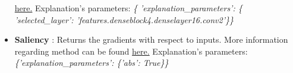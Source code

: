 \documentclass{article}%
\begin{document}
\begin{itemize}
\href{https://arxiv.org/abs/1610.02391}{here.}%
\newline%
%
Explanation's parameters: \newline%
%
\textit{\{   'explanation\_parameters': \{   'selected\_layer': 'features.denseblock4.denselayer16.conv2'\}\} \newline%
}%
\item%
\textbf{Saliency}%
: Returns the gradients with respect to inputs. More information regarding method can be found %
\href{https://arxiv.org/abs/1312.6034}{here.}%
\newline%
%
Explanation's parameters: \newline%
%
\textit{\{'explanation\_parameters': \{'abs': True\}\} \newline%
}%
\end{itemize}

%
\newpage%
\end{document}
